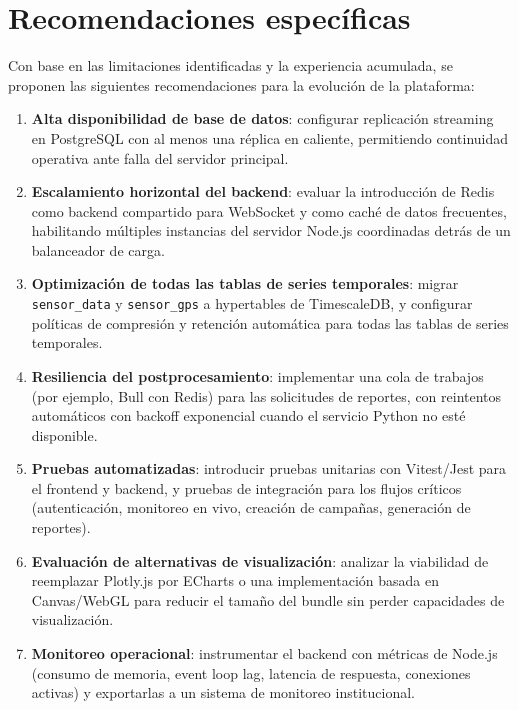 \section{Recomendaciones específicas}

Con base en las limitaciones identificadas y la experiencia acumulada, se
proponen las siguientes recomendaciones para la evolución de la plataforma:

\begin{enumerate}
    \item \textbf{Alta disponibilidad de base de datos}: configurar
    replicación streaming en PostgreSQL con al menos una réplica en caliente,
    permitiendo continuidad operativa ante falla del servidor principal.

    \item \textbf{Escalamiento horizontal del backend}: evaluar la
    introducción de Redis como backend compartido para WebSocket y como caché
    de datos frecuentes, habilitando múltiples instancias del servidor Node.js
    coordinadas detrás de un balanceador de carga.

    \item \textbf{Optimización de todas las tablas de series temporales}:
    migrar \texttt{sensor\_data} y \texttt{sensor\_gps} a hypertables de
    TimescaleDB, y configurar políticas de compresión y retención automática
    para todas las tablas de series temporales.

    \item \textbf{Resiliencia del postprocesamiento}: implementar una cola de
    trabajos (por ejemplo, Bull con Redis) para las solicitudes de reportes,
    con reintentos automáticos con backoff exponencial cuando el servicio
    Python no esté disponible.

    \item \textbf{Pruebas automatizadas}: introducir pruebas unitarias con
    Vitest/Jest para el frontend y backend, y pruebas de integración para los
    flujos críticos (autenticación, monitoreo en vivo, creación de campañas,
    generación de reportes).

    \item \textbf{Evaluación de alternativas de visualización}: analizar la
    viabilidad de reemplazar Plotly.js por ECharts o una implementación basada
    en Canvas/WebGL para reducir el tamaño del bundle sin perder capacidades
    de visualización.

    \item \textbf{Monitoreo operacional}: instrumentar el backend con métricas
    de Node.js (consumo de memoria, event loop lag, latencia de respuesta,
    conexiones activas) y exportarlas a un sistema de monitoreo institucional.


\end{enumerate}
